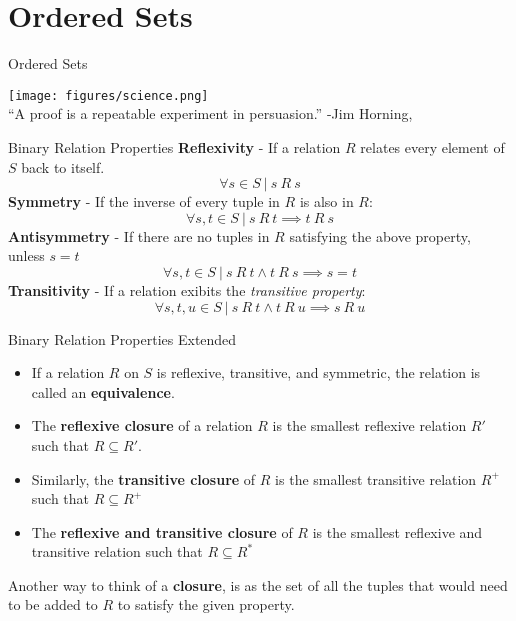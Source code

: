 \documentclass[11pt]{beamer}
\begin{document}
\section[Ordered Sets]{Ordered Sets}
\begin{frame}[fragile=singleslide]{Ordered Sets}
\begin{center}
\texttt{[image: figures/science.png]}\\
``A proof is a repeatable experiment in persuasion.'' -Jim Horning, 
\end{center}
\end{frame}

\begin{frame}[fragile=singleslide]{Binary Relation Properties}
\textbf{Reflexivity} - If a relation $R$ relates every element of $S$ back to itself.
\begin{equation}
\forall s \in S \:|\: s\:R\:s
\end{equation}
\textbf{Symmetry} - If the inverse of every tuple in $R$ is also in $R$:
\begin{equation}
\forall s, t \in S \:|\: s\:R\:t \implies t\:R\:s
\end{equation}
\textbf{Antisymmetry} - If there are no tuples in $R$ satisfying the above property, unless $s = t$ 
\begin{equation}
\forall s, t \in S \:|\: s\:R\:t \land t\:R\:s \implies s = t
\end{equation}
\textbf{Transitivity} - If a relation exibits the \emph{transitive property}:
\begin{equation}
\forall s, t, u \in S \:|\: s\:R\:t \land t\:R\:u \implies s\:R\:u
\end{equation}
\end{frame}

\begin{frame}[fragile=singleslide]{Binary Relation Properties Extended}
\begin{itemize}
\item If a relation $R$ on $S$ is reflexive, transitive, and symmetric, the relation is called an \textbf{equivalence}.
\item The \textbf{reflexive closure} of a relation $R$ is the smallest reflexive relation $R'$ such that $R \subseteq R'$.  
\item Similarly, the \textbf{transitive closure} of $R$ is the smallest transitive relation $R^+$ such that $R \subseteq R^+$
\item The \textbf{reflexive and transitive closure} of $R$ is the smallest reflexive and transitive relation such that $R \subseteq R^*$
\end{itemize}
Another way to think of a \textbf{closure}, is as the set of all the tuples that would need to be added to $R$ to satisfy the given property.
\end{frame}
\end{document}
